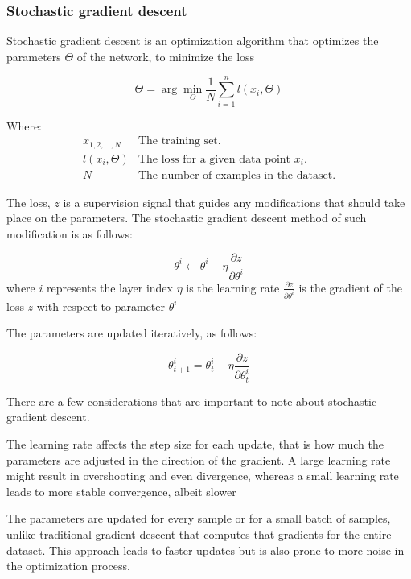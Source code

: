 		\bigskip
		\subsubsection{Stochastic gradient descent}
		
		Stochastic gradient descent is an optimization algorithm that optimizes the parameters $\Theta$ of the network, to minimize the loss
		
		$$
		\Theta = \arg \min_{\Theta}\frac{1}{N} \sum_{i=1}^{n}l(x_i, \Theta)
		$$

		Where:
		\[
		\begin{array}{ll}
			x_{1,2,\dots,N} & \text{The training set.} \\
			l(x_i, \Theta) & \text{The loss for a given data point } x_i. \\
			N & \text{The number of examples in the dataset.}
		\end{array}
		\]
		\bigskip
		
		The loss, $z$ is a supervision signal that guides any modifications that should take place on the parameters\cite{wu2017introduction}. The stochastic gradient descent method of such modification is as follows:
		
		$$
		\theta^i\leftarrow \theta^i - \eta \frac{\partial z}{\partial \theta^i}
		$$
		where 
		$i$ represents the layer index
		$\eta$ is the learning rate
		$\frac{\partial z}{\partial \theta^i}$ is the gradient of the loss $z$ with respect to parameter $\theta^i$
		
		The parameters are updated iteratively,  as follows:
		
		$$
		\theta^i_{t+1} = \theta^i_{t} - \eta \frac{\partial z}{\partial \theta^i_{t}}
		$$
		
		There are a few considerations that are important to note about stochastic gradient descent.
		
		The learning rate affects the step size for each update, that is how much the parameters are adjusted in the direction of the gradient. A large learning rate might result in overshooting and even divergence, whereas a small learning rate leads to more stable convergence, albeit slower
		
		The parameters are updated for every sample or for a small batch of samples, unlike traditional gradient descent that computes that gradients for the entire dataset. This approach leads to faster updates but is also prone to more noise in the optimization process.
		
		
		
